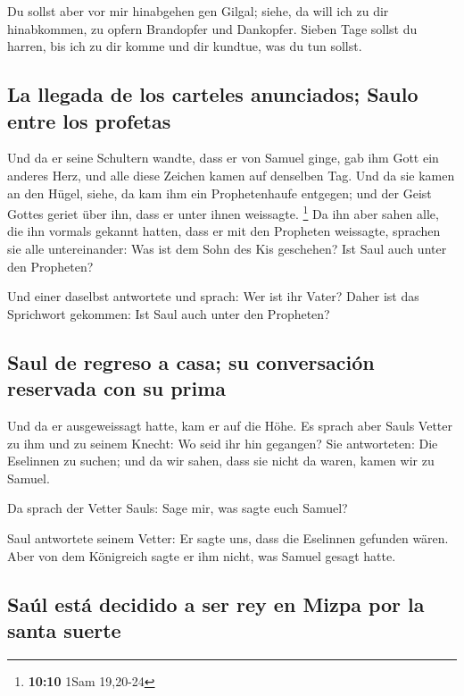  Du sollst aber vor mir hinabgehen gen Gilgal; siehe, da
will ich zu dir hinabkommen, zu opfern Brandopfer und Dankopfer. Sieben
Tage sollst du harren, bis ich zu dir komme und dir kundtue, was du tun
sollst.

\hypertarget{la-llegada-de-los-carteles-anunciados-saulo-entre-los-profetas}{%
\subsection{La llegada de los carteles anunciados; Saulo entre los
profetas}\label{la-llegada-de-los-carteles-anunciados-saulo-entre-los-profetas}}

 Und da er seine Schultern wandte, dass er von Samuel
ginge, gab ihm Gott ein anderes Herz, und alle diese Zeichen kamen auf
denselben Tag.  Und da sie kamen an den Hügel, siehe, da
kam ihm ein Prophetenhaufe entgegen; und der Geist Gottes geriet über
ihn, dass er unter ihnen weissagte. \footnote{\textbf{10:10} 1Sam
  19,20-24}  Da ihn aber sahen alle, die ihn vormals
gekannt hatten, dass er mit den Propheten weissagte, sprachen sie alle
untereinander: Was ist dem Sohn des Kis geschehen? Ist Saul auch unter
den Propheten?

 Und einer daselbst antwortete und sprach: Wer ist ihr
Vater? Daher ist das Sprichwort gekommen: Ist Saul auch unter den
Propheten?

\hypertarget{saul-de-regreso-a-casa-su-conversaciuxf3n-reservada-con-su-prima}{%
\subsection{Saul de regreso a casa; su conversación reservada con su
prima}\label{saul-de-regreso-a-casa-su-conversaciuxf3n-reservada-con-su-prima}}

 Und da er ausgeweissagt hatte, kam er auf die Höhe.
 Es sprach aber Sauls Vetter zu ihm und zu seinem Knecht:
Wo seid ihr hin gegangen? Sie antworteten: Die Eselinnen zu suchen; und
da wir sahen, dass sie nicht da waren, kamen wir zu Samuel.

 Da sprach der Vetter Sauls: Sage mir, was sagte euch
Samuel?

 Saul antwortete seinem Vetter: Er sagte uns, dass die
Eselinnen gefunden wären. Aber von dem Königreich sagte er ihm nicht,
was Samuel gesagt hatte.

\hypertarget{sauxfal-estuxe1-decidido-a-ser-rey-en-mizpa-por-la-santa-suerte}{%
\subsection{Saúl está decidido a ser rey en Mizpa por la santa
suerte}\label{sauxfal-estuxe1-decidido-a-ser-rey-en-mizpa-por-la-santa-suerte}}

